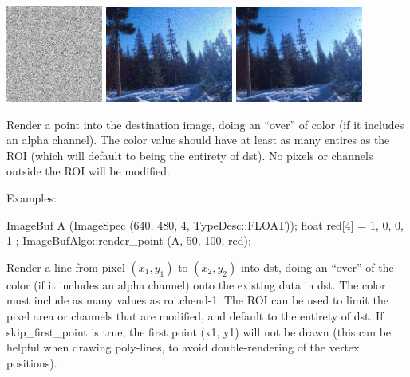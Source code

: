 \noindent
\includegraphics[width=1.25in]{figures/unifnoise1.jpg}
\spc \includegraphics[width=1.65in]{figures/tahoe-gauss.jpg} 
\spc \includegraphics[width=1.65in]{figures/tahoe-pepper.jpg}

\apiend


 
\NEW %
Render a point into the destination image,  doing an ``over'' of color (if
it includes an alpha channel). The {\cf color} value should have at least as
many entires as the ROI (which will default to being the entirety of
{\cf dst}). No pixels or channels outside the ROI will be modified.

\smallskip
\noindent Examples:
\begin{code}
    ImageBuf A (ImageSpec (640, 480, 4, TypeDesc::FLOAT));
    float red[4] = { 1, 0, 0, 1 };
    ImageBufAlgo::render_point (A, 50, 100, red);
\end{code}
\apiend


 
\NEW %
Render a line from pixel $(x_1,y_1)$ to $(x_2,y_2)$ into {\cf dst}, doing an
``over'' of the color (if it includes an alpha channel) onto the existing
data in {\cf dst}. The {\cf color} must include as many values as {\cf
roi.chend-1}. The ROI can be used to limit the pixel area or channels that
are modified, and default to the entirety of {\cf dst}. If {\cf skip_first_point}
is {\cf true}, the first point {\cf (x1, y1)} will not be drawn (this can
be helpful when drawing poly-lines, to avoid double-rendering of the
vertex positions).

